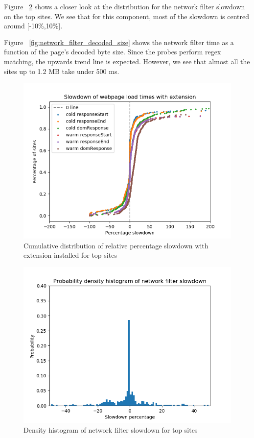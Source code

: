 Figure ~\ref{fig:histogram_slowdown} shows a closer look at the distribution for the network filter slowdown on the top sites. We see that for this component, most of the slowdown is centred around [-10\%,10\%].

Figure ~\ref{fig:network_filter_decoded_size} shows the network filter time as a function of the page's decoded byte size. Since the probes perform regex matching, the upwards trend line is expected. However, we see that almost all the sites up to 1.2 MB take under 500 ms.


\begin{figure}[h]
	\includegraphics[scale=0.5]{results/extension_slowdown_overall}
	\caption{Cumulative distribution of relative percentage slowdown with extension installed for top sites}
	\label{fig:overall_slowdown}
\end{figure}

\begin{figure}[h]
	\includegraphics[scale=0.5]{results/density_histogram_filter_slowdown}
	\caption{Density histogram of network filter slowdown for top sites}
	\label{fig:histogram_slowdown}
\end{figure}

